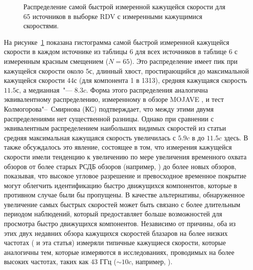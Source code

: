 \begin{figure}[tbh]
 \caption{Распределение самой быстрой измеренной кажущейся скорости для 65 источников в выборке RDV
с измеренными кажущимися скоростями.}
 \label{fig:rdv_max_speed_dist}
\end{figure}

На рисунке~\ref{fig:rdv_max_speed_dist} показана гистограмма самой быстрой измеренной кажущейся
скорости в каждом источнике из таблицы 6 для всех источников в таблице 6 с измеренным красным
смещением ($N = 65$). Это распределение имеет пик при кажущейся скорости около $5с$, длинный хвост,
простирающийся до максимальной кажущейся скорости $44с$ (для компонента 1 в 1313),
средняя кажущаяся скорость $11.5с$, а медианная~"--- $8.3c$. Форма этого распределения аналогична
эквивалентному распределению, измеренному в обзоре MOJAVE \cite{Lister_2009b}, и тест
Колмогорова"--~Смирнова (КС) подтверждает, что между этими двумя распределениями нет существенной
разницы. Однако при сравнении с эквивалентным распределением наибольших видимых скоростей из статьи
\cite{Piner_2007} средняя максимальная кажущаяся скорость увеличилась с $5.9c$ в \cite{Piner_2007}
до $11.5c$ здесь. В \cite{Lister_2009b} также обсуждалось это явление, состоящее в том, что
измерения кажущейся скорости имели тенденцию к увеличению по мере увеличения временного охвата
обзоров от более старых РСДБ обзоров (например, \cite{Britzen_2008,Piner_2007}) до более новых
обзоров, показывая, что высокое угловое разрешение и превосходное временное покрытие могут облегчить
идентификацию быстро движущихся компонентов, которые в противном случае были бы пропущены. В
качестве альтернативы, обнаруженное увеличение самых быстрых скоростей может быть связано с более
длительным периодом наблюдений, который предоставляет больше возможностей для просмотра быстро
движущихся компонентов. Независимо от причины, оба из этих двух недавних обзора кажущихся скоростей
блазаров на более низких частотах (\cite{Lister_2009b} и эта статья) измеряли типичные кажущиеся
скорости, которые аналогичны тем, которые измеряются в исследованиях, проводимых на более высоких
частотах, таких как 43 ГГц ($\sim10c$, например, \cite{Jorstad_2005}).

